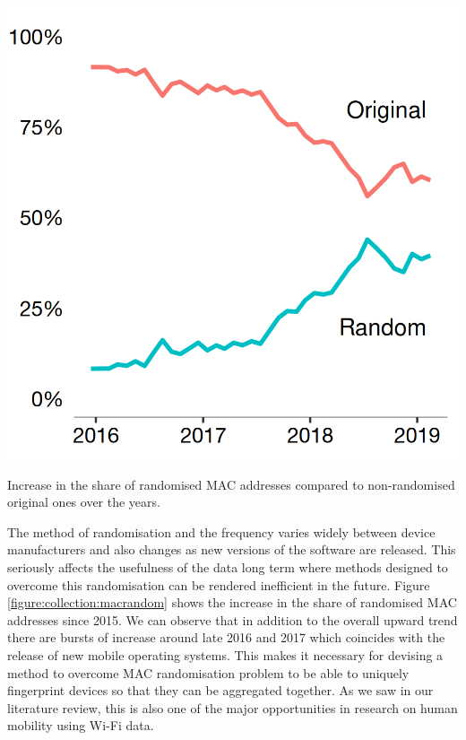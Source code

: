 \begin{marginfigure}
  \includegraphics{images/mac-randomisation.png}
  \caption{Increase in the share of randomised MAC addresses compared to non-randomised original ones over the years.}
  \label{figure:collection:macrandom}
\end{marginfigure}

The method of randomisation and the frequency varies widely between device manufacturers and also changes as new versions of the software are released.
This seriously affects the usefulness of the data long term where methods designed to overcome this randomisation can be rendered inefficient in the future.
Figure \ref{figure:collection:macrandom} shows the increase in the share of randomised MAC addresses since 2015.
We can observe that in addition to the overall upward trend there are bursts of increase around late 2016 and 2017 which coincides with the release of new mobile operating systems.
This makes it necessary for devising a method to overcome MAC randomisation problem to be able to uniquely fingerprint devices so that they can be aggregated together.
As we saw in our literature review, this is also one of the major opportunities in research on human mobility using Wi-Fi data.

